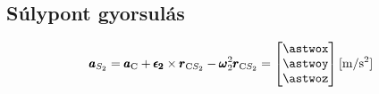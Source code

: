 \subsection{Súlypont gyorsulás}
\begin{align}
	\pmb{a}_{S_2} =
	\pmb{a}_\text{C} + \pmb{\epsilon_2} \times \pmb{r}_{\text{C}{S_2}} - \pmb{\omega}_2^2\pmb{r}_{\text{C}{S_2}} = 
	\begin{bmatrix}
		\astwox \\ \astwoy \\ \astwoz
	\end{bmatrix} \siunit{}{\m\per\second^2}
\end{align}
